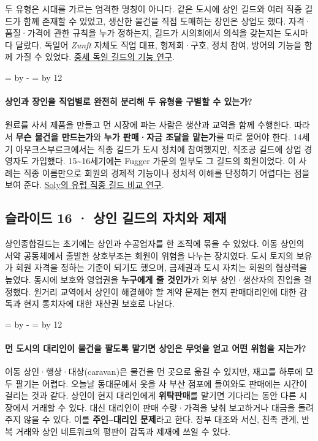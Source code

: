\documentclass[10pt,a4paper]{article}
\newcommand{\ReserveQuestionSpace}{%
  \par\begingroup
  \dimen0=\pagegoal \advance\dimen0 by -\pagetotal
  \dimen2=\baselineskip \multiply\dimen2 by 12
  \ifdim\dimen0<\dimen2 \newpage\fi
  \endgroup}
\begin{document}
두 유형은 시대를 가르는 엄격한 명칭이 아니다. 같은 도시에 상인 길드와 여러 직종 길드가 함께 존재할 수 있었고, 생산한 물건을 직접 도매하는 장인은 상업도 했다. 자격·품질·가격에 관한 규칙을 누가 정하는지, 길드가 시의회에서 의석을 갖는지는 도시마다 달랐다. 독일어 \emph{Zunft} 자체도 직업 대표, 형제회·구호, 정치 참여, 방어의 기능을 함께 가질 수 있었다. \href{https://kups.ub.uni-koeln.de/49874/}{중세 독일 길드의 기능 연구}.\par

\ReserveQuestionSpace
\paragraph{상인과 장인을 직업별로 완전히 분리해 두 유형을 구별할 수 있는가?}

원료를 사서 제품을 만들고 먼 시장에 파는 사람은 생산과 교역을 함께 수행한다. 따라서 \textbf{무슨 물건을 만드는가}와 \textbf{누가 판매·자금 조달을 맡는가}를 따로 물어야 한다. 14세기 아우크스부르크에서는 직종 길드가 도시 정치에 참여했지만, 직조공 길드에 상업 경영자도 가입했다. 15\textasciitilde{}16세기에는 Fugger 가문의 일부도 그 길드의 회원이었다. 이 사례는 직종 이름만으로 회원의 경제적 기능이나 정치적 이해를 단정하기 어렵다는 점을 보여 준다. \href{https://doi.org/10.1017/S002085900800360X}{Soly의 유럽 직종 길드 비교 연구}.\par

\subsection{슬라이드 16 · 상인 길드의 자치와 제재}
상인종합길드는 초기에는 상인과 수공업자를 한 조직에 묶을 수 있었다. 이동 상인의 서약 공동체에서 출발한 상호부조는 회원이 위험을 나누는 장치였다. 도시 토지의 보유가 회원 자격을 정하는 기준이 되기도 했으며, 금제권과 도시 자치는 회원의 협상력을 높였다. 동시에 보호와 영업권을 \textbf{누구에게 줄 것인가}가 외부 상인·생산자의 진입을 결정했다. 원거리 교역에서 상인이 해결해야 할 계약 문제는 현지 판매대리인에 대한 감독과 현지 통치자에 대한 재산권 보호로 나뉜다.\par

\ReserveQuestionSpace
\paragraph{먼 도시의 대리인이 물건을 팔도록 맡기면 상인은 무엇을 얻고 어떤 위험을 지는가?}

이동 상인·행상·대상(caravan)은 물건을 먼 곳으로 옮길 수 있지만, 재고를 하루에 모두 팔기는 어렵다. 오늘날 동대문에서 옷을 사 부산 점포에 들여와도 판매에는 시간이 걸리는 것과 같다. 상인이 현지 대리인에게 \textbf{위탁판매}를 맡기면 기다리는 동안 다른 시장에서 거래할 수 있다. 대신 대리인이 판매 수량·가격을 낮춰 보고하거나 대금을 돌려주지 않을 수 있다. 이를 \textbf{주인–대리인 문제}라고 한다. 장부 대조와 서신, 친족 관계, 반복 거래와 상인 네트워크의 평판이 감독과 제재에 쓰일 수 있다.\par
\end{document}

